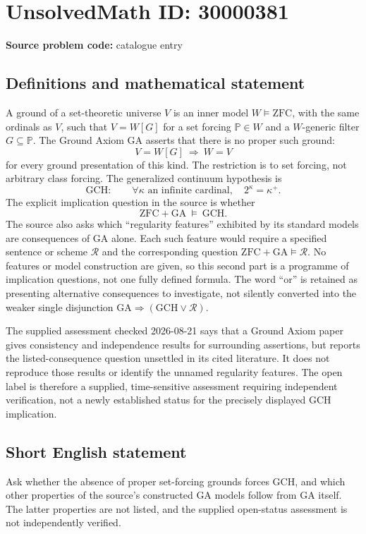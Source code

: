 \documentclass[11pt]{article}
\begin{document}
\section*{UnsolvedMath ID: 30000381}
\textbf{Source problem code:} catalogue entry
\subsection{Definitions and mathematical statement}
A ground of a set-theoretic universe \(V\) is an inner model \(W\models\mathrm{ZFC}\), with the same ordinals as \(V\), such that \(V=W[G]\) for a set forcing \(\mathbb P\in W\) and a \(W\)-generic filter \(G\subseteq\mathbb P\). The Ground Axiom \(\mathrm{GA}\) asserts that there is no proper such ground:
\[
V=W[G]\ \Longrightarrow\ W=V
\]
for every ground presentation of this kind. The restriction is to set forcing, not arbitrary class forcing. The generalized continuum hypothesis is
\[
\mathrm{GCH}:\qquad\forall\kappa\text{ an infinite cardinal},\quad 2^\kappa=\kappa^+.
\]
The explicit implication question in the source is whether
\[
\mathrm{ZFC}+\mathrm{GA}\ \models\ \mathrm{GCH}.
\]
The source also asks which ``regularity features'' exhibited by its standard models are consequences of GA alone. Each such feature would require a specified sentence or scheme \(\mathcal R\) and the corresponding question \(\mathrm{ZFC}+\mathrm{GA}\models\mathcal R\). No features or model construction are given, so this second part is a programme of implication questions, not one fully defined formula. The word ``or'' is retained as presenting alternative consequences to investigate, not silently converted into the weaker single disjunction \(\mathrm{GA}\Rightarrow(\mathrm{GCH}\lor\mathcal R)\).

The supplied assessment checked 2026-08-21 says that a Ground Axiom paper gives consistency and independence results for surrounding assertions, but reports the listed-consequence question unsettled in its cited literature. It does not reproduce those results or identify the unnamed regularity features. The open label is therefore a supplied, time-sensitive assessment requiring independent verification, not a newly established status for the precisely displayed GCH implication.
\subsection{Short English statement}
Ask whether the absence of proper set-forcing grounds forces GCH, and which other properties of the source's constructed GA models follow from GA itself. The latter properties are not listed, and the supplied open-status assessment is not independently verified.
\end{document}
